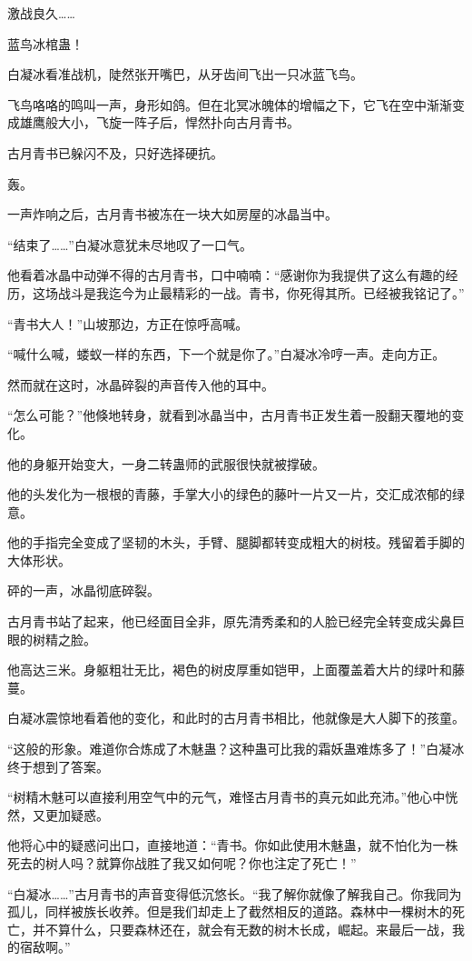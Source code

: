 \begin{this_body}
激战良久……

蓝鸟冰棺蛊！

白凝冰看准战机，陡然张开嘴巴，从牙齿间飞出一只冰蓝飞鸟。

飞鸟咯咯的鸣叫一声，身形如鸽。但在北冥冰魄体的增幅之下，它飞在空中渐渐变成雄鹰般大小，飞旋一阵子后，悍然扑向古月青书。

古月青书已躲闪不及，只好选择硬抗。

轰。

一声炸响之后，古月青书被冻在一块大如房屋的冰晶当中。

“结束了……”白凝冰意犹未尽地叹了一口气。

他看着冰晶中动弹不得的古月青书，口中喃喃：“感谢你为我提供了这么有趣的经历，这场战斗是我迄今为止最精彩的一战。青书，你死得其所。已经被我铭记了。”

“青书大人！”山坡那边，方正在惊呼高喊。

“喊什么喊，蝼蚁一样的东西，下一个就是你了。”白凝冰冷哼一声。走向方正。

然而就在这时，冰晶碎裂的声音传入他的耳中。

“怎么可能？”他倏地转身，就看到冰晶当中，古月青书正发生着一股翻天覆地的变化。

他的身躯开始变大，一身二转蛊师的武服很快就被撑破。

他的头发化为一根根的青藤，手掌大小的绿色的藤叶一片又一片，交汇成浓郁的绿意。

他的手指完全变成了坚韧的木头，手臂、腿脚都转变成粗大的树枝。残留着手脚的大体形状。

砰的一声，冰晶彻底碎裂。

古月青书站了起来，他已经面目全非，原先清秀柔和的人脸已经完全转变成尖鼻巨眼的树精之脸。

他高达三米。身躯粗壮无比，褐色的树皮厚重如铠甲，上面覆盖着大片的绿叶和藤蔓。

白凝冰震惊地看着他的变化，和此时的古月青书相比，他就像是大人脚下的孩童。

“这般的形象。难道你合炼成了木魅蛊？这种蛊可比我的霜妖蛊难炼多了！”白凝冰终于想到了答案。

“树精木魅可以直接利用空气中的元气，难怪古月青书的真元如此充沛。”他心中恍然，又更加疑惑。

他将心中的疑惑问出口，直接地道：“青书。你如此使用木魅蛊，就不怕化为一株死去的树人吗？就算你战胜了我又如何呢？你也注定了死亡！”

“白凝冰……”古月青书的声音变得低沉悠长。“我了解你就像了解我自己。你我同为孤儿，同样被族长收养。但是我们却走上了截然相反的道路。森林中一棵树木的死亡，并不算什么，只要森林还在，就会有无数的树木长成，崛起。来最后一战，我的宿敌啊。”


\end{this_body}
